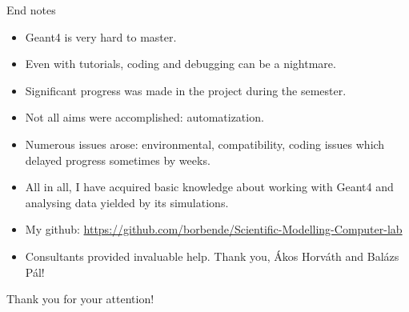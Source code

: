 \documentclass[11pt]{beamer}
\begin{document}
\begin{frame}{End notes}
\begin{itemize}
    \item<tri@1-> Geant4 is very hard to master.
    \vspace{0.1 cm}
    \item<tri@1-> Even with tutorials, coding and debugging can be a nightmare.
    \item<tri@1-> Significant progress was made in the project during the semester.
    \vspace{0.1 cm}
    \item<tri@1-> Not all aims were accomplished: automatization.
    \vspace{0.1 cm}
    \item<tri@1->Numerous issues arose: environmental, compatibility, coding issues which delayed progress sometimes by weeks.
    \vspace{0.1 cm}
    \item<tri@1-> All in all, I have acquired basic knowledge about working with Geant4 and analysing data yielded by its simulations.
    \vspace{0.1 cm}
    \item<tri@1-> My github: \url{https://github.com/borbende/Scientific-Modelling-Computer-lab}
    \vspace{0.1 cm}
    \item<tri@1-> Consultants provided invaluable help. Thank you, Ákos Horváth and Balázs Pál!
\end{itemize}

    \centering
    \alert{Thank you for your attention!}
    
\end{frame}
\end{document}
